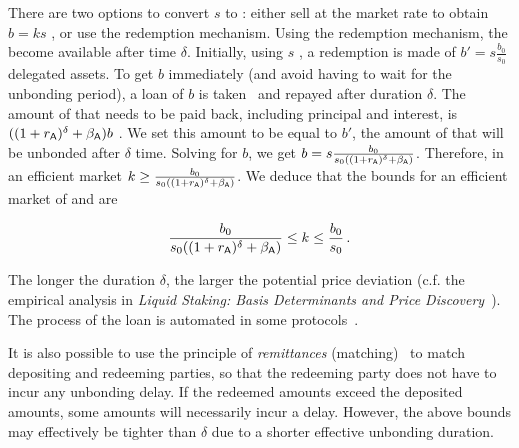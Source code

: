 There are two options to convert $s$ \stasset to \asset: either sell
at the market rate to obtain $b = k s$ \asset, or use the redemption mechanism.
Using the redemption mechanism, the \assets become available after
time $\delta$.
Initially, using $s$ \stasset, a redemption is made of $b' = s \frac{b_0}{s_0}$
delegated assets. To get $b$ \asset immediately (and avoid having to wait
for the unbonding period), a loan of $b$ \asset is taken~\cite[p.~13]{liquid-staking-report} and
repayed after duration $\delta$.
The amount of \asset that needs to be paid back,
including principal and interest, is $((1 + r_{\textsf{A}})^\delta + \beta_{\textsf{A}})b$ \asset.
We set this amount to be equal to $b'$, the amount of \assets that will be
unbonded after $\delta$ time. Solving for $b$, we get
$b = s \frac{b_0}{s_0 ((1 + r_{\textsf{A}})^\delta + \beta_{\textsf{A}})}$.
Therefore, in an efficient market $k \geq \frac{b_0}{s_0 ((1 + r_{\textsf{A}})^\delta + \beta_{\textsf{A}})}$.
We deduce that the bounds for an efficient market of \asset and \stasset are

\[
  \frac{b_0}{s_0 ((1 + r_{\textsf{A}})^\delta + \beta_{\textsf{A}})} \leq k \leq \frac{b_0}{s_0}\,.
\]

The longer the duration $\delta$, the larger the potential price deviation
(c.f. the empirical analysis in
\emph{Liquid Staking: Basis Determinants and Price Discovery}~\cite{scharnowski2022liquid}).
The process of the loan is automated in some protocols~\cite[\S5]{parallel}\cite{marinade-matching}.

It is also possible to use the principle of \emph{remittances}
(matching)~\cite[\S5]{parallel}\cite{marinade-matching} to match depositing and
redeeming parties, so that the redeeming party does not have to incur any unbonding delay.
If the redeemed amounts exceed the deposited amounts, some amounts will necessarily incur
a delay. However, the above bounds may effectively be tighter than $\delta$ due to
a shorter effective unbonding duration.


